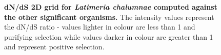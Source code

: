 \documentclass{article}
\begin{document}
\begin{figure}[H]
\centering
{}
\caption{\textbf{dN/dS 2D grid for \textit{Latimeria chalumnae} computed against the other significant organisms.} The intensity values represent the dN/dS ratio - values lighter in colour are less than 1 and purifying selection while values darker in colour are greater than 1 and represent positive selection.}
\label{sup_fig_27}
\end{figure}
\end{document}
